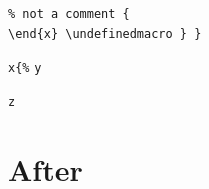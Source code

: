 \documentclass{article}
\newcommand\Wrap[1]{#1}
\begin{document}
\begin{lstlisting}
% not a comment {
\end{x} \undefinedmacro } }
\end{lstlisting}
\gdef\AfterA{}
\lstinline|x{%|\gdef\AfterB{}
\lstinline{y}\gdef\AfterC{}

\gdef\AfterD{}
\Wrap{\lstinline{z}}\gdef\AfterE{}
\section{After}\label{after}
\gdef\SatexReachedEnd{}
\end{document}
